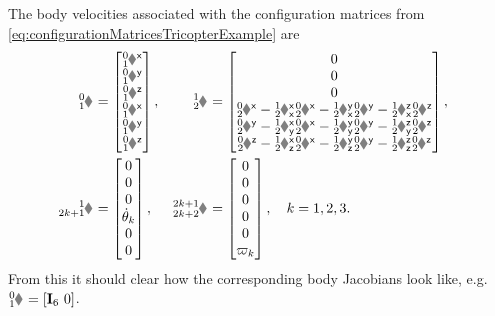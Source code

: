 \begin{Example}
The body velocities associated with the configuration matrices from \eqref{eq:configurationMatricesTricopterExample} are
\begin{subequations}
\begin{align}
 \bodyVel{0}{1} &= \begin{bmatrix} \bodyLinVelx{0}{1} \\ \bodyLinVely{0}{1} \\ \bodyLinVelz{0}{1} \\ \bodyAngVelx{0}{1} \\ \bodyAngVely{0}{1} \\ \bodyAngVelz{0}{1} \end{bmatrix},&
 \bodyVel{1}{2} &= 
 \begin{bmatrix}
  0 \\ 0 \\ 0 \\
  \bodyAngVelx{0}{2} - \bodyRotxx{1}{2} \bodyAngVelx{0}{2} - \bodyRotyx{1}{2} \bodyAngVely{0}{2} - \bodyRotzx{1}{2} \bodyAngVelz{0}{2} \\
  \bodyAngVely{0}{2} - \bodyRotxy{1}{2} \bodyAngVelx{0}{2} - \bodyRotyy{1}{2} \bodyAngVely{0}{2} - \bodyRotzy{1}{2} \bodyAngVelz{0}{2} \\
  \bodyAngVelz{0}{2} - \bodyRotxz{1}{2} \bodyAngVelx{0}{2} - \bodyRotyz{1}{2} \bodyAngVely{0}{2} - \bodyRotzz{1}{2} \bodyAngVelz{0}{2} 
 \end{bmatrix},&
\\
 \bodyVel{1}{2k+1} &= \begin{bmatrix} 0 \\ 0 \\ 0 \\ \aServod[k] \\ 0 \\ 0 \end{bmatrix},&
 \bodyVel{2k+1}{2k+2} &= \begin{bmatrix} 0 \\ 0 \\ 0 \\ 0 \\ 0 \\ \PropVel[k] \end{bmatrix},
\quad k=1,2,3.
\end{align}
\end{subequations}
From this it should clear how the corresponding body Jacobians look like, e.g.\ $\bodyJac{0}{1} = [\idMat[6] \ 0]$.


\end{Example}
